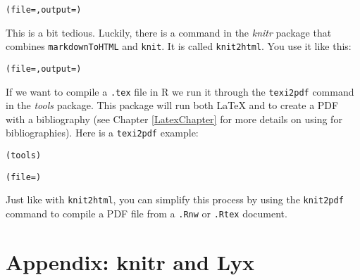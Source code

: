 \begin{knitrout}
\color{fgcolor}\begin{kframe}
\begin{alltt}
(file = , output = )
\end{alltt}
\end{kframe}
\end{knitrout}


\noindent This is a bit tedious. Luckily, there is a command in the {\emph{knitr}} package that combines \texttt{markdownToHTML} and \texttt{knit}. It is called \texttt{knit2html}. You use it like this:

\begin{knitrout}
\color{fgcolor}\begin{kframe}
\begin{alltt}
(file = , output = )
\end{alltt}
\end{kframe}
\end{knitrout}


\noindent If we want to compile a {\tt{.tex}} file in R we run it through the {\tt{texi2pdf}} command in the {\emph{tools}} package. This package will run both LaTeX and \BibTeX to create a PDF with a bibliography (see Chapter \ref{LatexChapter} for more details on using \BibTeX for bibliographies). Here is a {\tt{texi2pdf}} example:

\begin{knitrout}
\color{fgcolor}\begin{kframe}
\begin{alltt}
(tools)

(file = )
\end{alltt}
\end{kframe}
\end{knitrout}


\noindent Just like with \texttt{knit2html}, you can simplify this process by using the \texttt{knit2pdf} command to compile a PDF file from a \texttt{.Rnw} or \texttt{.Rtex} document.

\section*{Appendix: knitr and Lyx}

